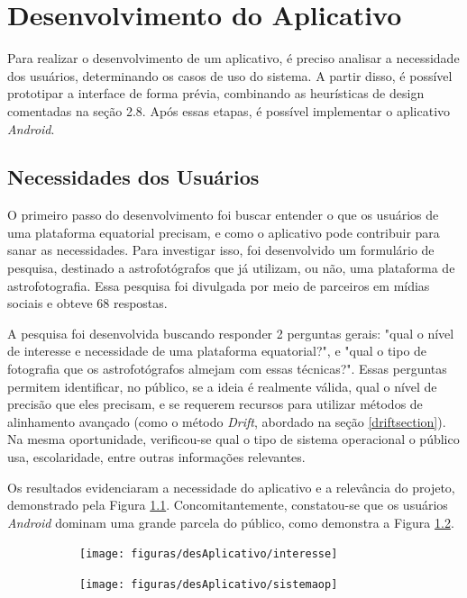 \chapter{Desenvolvimento do Aplicativo}

Para realizar o desenvolvimento de um aplicativo, é preciso analisar a necessidade dos usuários, determinando os casos de uso do sistema. A partir disso, é possível prototipar a interface de forma prévia, combinando as heurísticas de design comentadas na seção 2.8. Após essas etapas, é possível implementar o aplicativo \textit{Android}.

\section{Necessidades dos Usuários}

O primeiro passo do desenvolvimento foi buscar entender o que os usuários de uma plataforma equatorial precisam, e como o aplicativo pode contribuir para sanar as necessidades. Para investigar isso, foi desenvolvido um formulário de pesquisa, destinado a astrofotógrafos que já utilizam, ou não, uma plataforma de astrofotografia. Essa pesquisa foi divulgada por meio de parceiros em mídias sociais e obteve 68 respostas.

A pesquisa foi desenvolvida buscando responder 2 perguntas gerais: "qual o nível de interesse e necessidade de uma plataforma equatorial?", e "qual o tipo de fotografia que os astrofotógrafos almejam com essas técnicas?". Essas perguntas permitem identificar, no público, se a ideia é realmente válida, qual o nível de precisão que eles precisam, e se requerem recursos para utilizar métodos de alinhamento avançado (como o método \textit{Drift}, abordado na seção \ref{driftsection}). Na mesma oportunidade, verificou-se qual o tipo de sistema operacional o público usa, escolaridade, entre outras informações relevantes.
 
Os resultados evidenciaram a necessidade do aplicativo e a relevância do projeto, demonstrado pela Figura \ref{fig:resultadoapp}. Concomitantemente, constatou-se que os usuários \textit{Android} dominam uma grande parcela do público, como demonstra a Figura \ref{fig:usuariosandroid}. 


\begin{figure}[!htb]
	\centering
	\captionsetup[subfigure]{justification=centering}
	\caption{Resultados do Formulário de Pesquisa com Usuários: (a) Interesse dos astrofotógrafos no aplicativo, e; (b) sistema operacional usado}
	\begin{subfigure}[b]{0.58\textwidth}
		\centering
		\texttt{[image: figuras/desAplicativo/interesse]}
		\caption{}
		\label{fig:resultadoapp}
	\end{subfigure}
	\hfill
	\begin{subfigure}[b]{0.41\textwidth}
		\centering
		\texttt{[image: figuras/desAplicativo/sistemaop]}
		\caption{}
		\label{fig:usuariosandroid}
	\end{subfigure}
	\label{fig:resultadosforms}
\end{figure}

